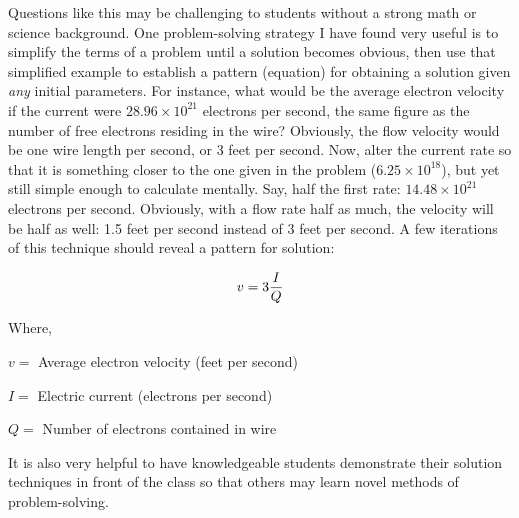 Questions like this may be challenging to students without a strong math or science background.  One problem-solving strategy I have found very useful is to simplify the terms of a problem until a solution becomes obvious, then use that simplified example to establish a pattern (equation) for obtaining a solution given {\it any} initial parameters.  For instance, what would be the average electron velocity if the current were $28.96 \times 10^{21}$ electrons per second, the same figure as the number of free electrons residing in the wire?  Obviously, the flow velocity would be one wire length per second, or 3 feet per second.  Now, alter the current rate so that it is something closer to the one given in the problem ($6.25 \times 10^{18}$), but yet still simple enough to calculate mentally.  Say, half the first rate: $14.48 \times 10^{21}$ electrons per second.  Obviously, with a flow rate half as much, the velocity will be half as well: 1.5 feet per second instead of 3 feet per second.  A few iterations of this technique should reveal a pattern for solution:

$$v = 3 {I \over Q}$$

\noindent
Where,

$v =$ Average electron velocity (feet per second)

$I =$ Electric current (electrons per second)

$Q =$ Number of electrons contained in wire

\vskip 10pt

It is also very helpful to have knowledgeable students demonstrate their solution techniques in front of the class so that others may learn novel methods of problem-solving.




